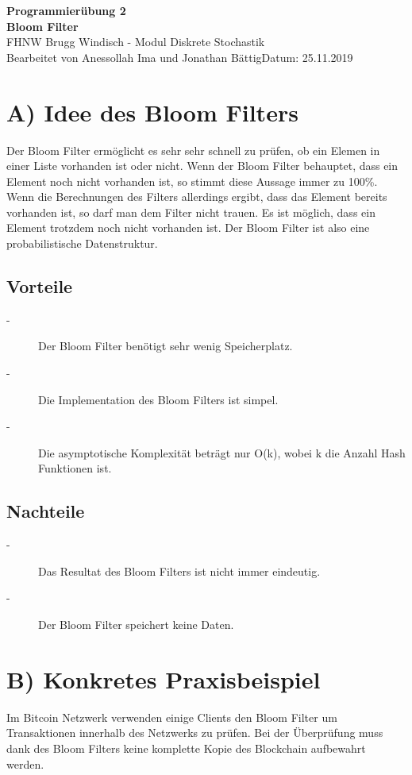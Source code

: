 \documentclass[a4paper, 11pt]{article}
\begin{document}
\noindent
\large\textbf{Programmierübung 2} \\
\textbf{Bloom Filter} \\
\normalsize FHNW Brugg Windisch - Modul Diskrete Stochastik \\
Bearbeitet von Anessollah Ima und Jonathan Bättig\hfill Datum: 25.11.2019 \\
 

\section*{A) Idee des Bloom Filters}
Der Bloom Filter ermöglicht es sehr sehr schnell zu prüfen, ob ein Elemen in einer Liste vorhanden ist oder nicht. Wenn der Bloom Filter behauptet, dass ein Element noch nicht vorhanden ist, so stimmt diese Aussage immer zu 100\%. Wenn die Berechnungen des Filters allerdings ergibt, dass das Element bereits vorhanden ist, so darf man dem Filter nicht trauen. Es ist möglich, dass ein Element trotzdem noch nicht vorhanden ist. Der Bloom Filter ist also eine probabilistische Datenstruktur.
\cite{Wikipedia}
\cite{Youtube}

\subsection{Vorteile}
\begin{description}
\item[-]
Der Bloom Filter benötigt sehr wenig Speicherplatz.
\item[-]
Die Implementation des Bloom Filters ist simpel.
\item[-]
Die asymptotische Komplexität beträgt nur O(k), wobei k die Anzahl Hash Funktionen ist.
\end{description}

\subsection{Nachteile}
\begin{description}
\item[-]
Das Resultat des Bloom Filters ist nicht immer eindeutig.
\item[-]
Der Bloom Filter speichert keine Daten.
\end{description}

\section*{B) Konkretes Praxisbeispiel}
Im Bitcoin Netzwerk verwenden einige Clients den Bloom Filter um Transaktionen innerhalb des Netzwerks zu prüfen. Bei der Überprüfung muss dank des Bloom Filters keine komplette Kopie des Blockchain aufbewahrt werden.
\cite{Medium}
\end{document}
